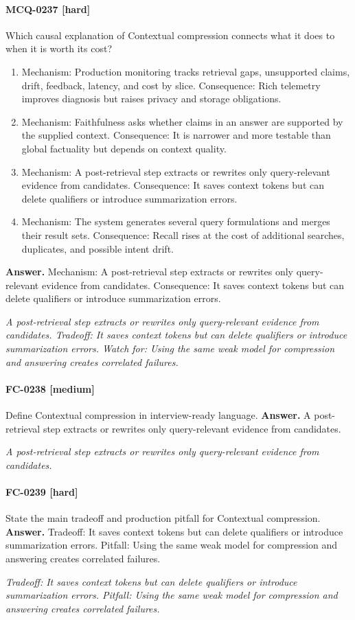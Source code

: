 \paragraph{MCQ-0237 [hard]} Which causal explanation of Contextual compression connects what it does to when it is worth its cost?
\begin{enumerate}[label=\Alph*.]
\item Mechanism: Production monitoring tracks retrieval gaps, unsupported claims, drift, feedback, latency, and cost by slice. Consequence: Rich telemetry improves diagnosis but raises privacy and storage obligations.
\item Mechanism: Faithfulness asks whether claims in an answer are supported by the supplied context. Consequence: It is narrower and more testable than global factuality but depends on context quality.
\item Mechanism: A post-retrieval step extracts or rewrites only query-relevant evidence from candidates. Consequence: It saves context tokens but can delete qualifiers or introduce summarization errors.
\item Mechanism: The system generates several query formulations and merges their result sets. Consequence: Recall rises at the cost of additional searches, duplicates, and possible intent drift.
\end{enumerate}
\noindent\textbf{Answer.} Mechanism: A post-retrieval step extracts or rewrites only query-relevant evidence from candidates. Consequence: It saves context tokens but can delete qualifiers or introduce summarization errors.
\par\textit{A post-retrieval step extracts or rewrites only query-relevant evidence from candidates. Tradeoff: It saves context tokens but can delete qualifiers or introduce summarization errors. Watch for: Using the same weak model for compression and answering creates correlated failures.}
\paragraph{FC-0238 [medium]} Define Contextual compression in interview-ready language.
\noindent\textbf{Answer.} A post-retrieval step extracts or rewrites only query-relevant evidence from candidates.
\par\textit{A post-retrieval step extracts or rewrites only query-relevant evidence from candidates.}
\paragraph{FC-0239 [hard]} State the main tradeoff and production pitfall for Contextual compression.
\noindent\textbf{Answer.} Tradeoff: It saves context tokens but can delete qualifiers or introduce summarization errors. Pitfall: Using the same weak model for compression and answering creates correlated failures.
\par\textit{Tradeoff: It saves context tokens but can delete qualifiers or introduce summarization errors. Pitfall: Using the same weak model for compression and answering creates correlated failures.}
